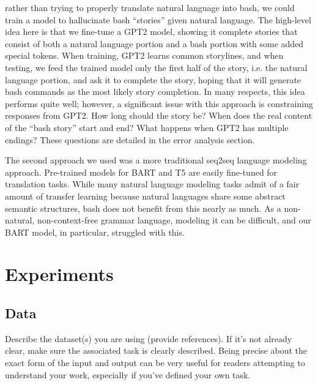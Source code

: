 \documentclass{article}
\begin{document}
rather than trying to properly translate natural language into bash, we could
train a model to hallucinate bash ``stories'' given natural language. The
high-level idea here is that we fine-tune a GPT2 model, showing it complete
stories that consist of both a natural language portion and a bash portion with
some added special tokens. When training, GPT2 learns common storylines,
and when testing, we feed the trained model only the first half of the
story, i.e. the natural language portion, and ask it to complete the story,
hoping that it will generate bash commands as the most likely story completion.
In many respects, this idea performs quite well; however, a significant issue
with this approach is constraining responses from GPT2. How long should the
story be? When does the real content of the ``bash story'' start and end? What
happens when GPT2 has multiple endings? These questions are detailed in the
error analysis section.
\par
The second approach we used was a more traditional seq2seq language modeling
approach. Pre-trained models for BART and T5 are easily fine-tuned for
translation tasks. While many natural language modeling tasks admit of a fair
amount of transfer learning because natural languages share some abstract
semantic structures, bash does not benefit from this nearly as much. As a
non-natural, non-context-free grammar language, modeling it can be difficult,
and our BART model, in particular, struggled with this.

\section{Experiments}
\subsection{Data}
Describe the dataset(s) you are using (provide references). If it's not already clear, make sure the associated task is clearly described.
Being precise about the exact form of the input and output can be very useful for readers attempting to understand your work, especially if you've defined your own task.
\end{document}
